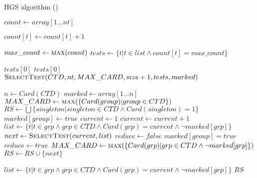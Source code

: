 \clearpage

\begin{algorithm}[ht!]
\caption{HGS algorithm (\cite{hgs})}
\label{alg:hgs}
\begin{algorithmic}[1]
	
		\State $count\gets array[1 \dots nt]$ 
		
					\State $count[t] \gets count[t] + 1$
				\EndIf
			\EndFor
		\EndFor
		
		\State $max\_count \gets \Call{max}{count}$
		\State $tests \gets \{t \vert t \in list \wedge count[t] = max\_count\}$
		
			\Return $tests[0]$
			\Return $tests[0]$
		\Else{}
			\Return $\Call{SelectTest}{CTD, nt, MAX\_CARD, size + 1, tests, marked}$
		\EndIf
	\EndFunction
	
		\State $n \gets Card(CTD)$
		\State $marked \gets array[1 \dots n]$ 
		\State $MAX\_CARD \gets \Call{max}{\{Card(group) \vert group \in CTD\}}$
		\State $RS \gets \bigcup \{ singleton \vert singleton \in CTD \wedge Card(singleton) = 1 \}$
				\State $marked[group] \gets true$
			\EndIf
		\EndFor
		\State $current \gets 1$
			\State $current \gets current + 1$
			\State $list \gets \{t \vert t \in grp \wedge grp \in CTD \wedge Card(grp) = current \wedge \neg marked[grp]\}$
				\State $next \gets \Call{SelectTest}{current, list}$
				\State $reduce \gets false$
						\State $marked[group] = true$
							\State $reduce \gets true$
						\EndIf
					\EndIf
				\EndFor
					\State $MAX\_CARD \gets \Call{max}{\{Card(grp) \vert grp \in CTD \wedge \neg marked[grp]\}}$
				\EndIf
				\State $RS \gets RS \cup \{next\}$
				
				\State $list \gets \{t \vert t \in grp \wedge grp \in CTD \wedge Card(grp) = current \wedge \neg marked[grp]\}$
			\EndWhile
		\EndWhile
		\State \Return $RS$
	\EndProcedure
\end{algorithmic}
\end{algorithm}